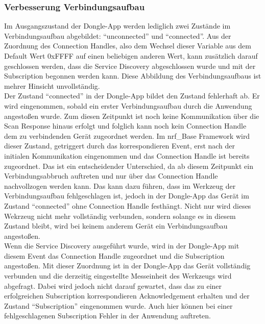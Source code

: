 \subsubsection{Verbesserung Verbindungsaufbau}
Im Ausgangszustand der Dongle-App werden lediglich zwei Zustände im Verbindungsaufbau abgebildet: ``unconnected'' und ``connected''. Aus der Zuordnung des Connection Handles, also dem Wechsel dieser Variable aus dem Default Wert 0xFFFF auf einen beliebigen anderen Wert, kann zusätzlich darauf geschlossen werden, dass die Service Discovery abgeschlossen wurde und mit der Subscription begonnen werden kann. Diese Abbildung des Verbindungsaufbaus ist mehrer Hinsicht unvollständig.\\
Der Zustand ``connected'' in der Dongle-App bildet den Zustand fehlerhaft ab. Er wird eingenommen, sobald ein erster Verbindungsaufbau durch die Anwendung angestoßen wurde. Zum diesen Zeitpunkt ist noch keine Kommunikation über die Scan Response hinaus erfolgt und folglich kann noch kein Connection Handle dem zu verbindenden Gerät zugeordnet werden. Im nrf\_Base Framework wird dieser Zustand, getriggert durch das korrespondieren Event, erst nach der initialen Kommunikation eingenommen und das Connection Handle ist bereits zugeordnet. Das ist ein entscheidender Unterschied, da ab diesem Zeitpunkt ein Verbindungsabbruch auftreten und nur über das Connection Handle nachvollzogen werden kann. Das kann dazu führen, dass im Werkzeug der Verbindungsaufbau fehlgeschlagen ist, jedoch in der Dongle-App das Gerät im Zustand ``connected'' ohne Connection Handle festhängt. Nicht nur wird dieses Wekrzeug nicht mehr vollständig verbunden, sondern solange es in diesem Zustand bleibt, wird bei keinem anderem Gerät ein Verbindungsaufbau angestoßen.\\
Wenn die Service Discovery ausgeführt wurde, wird in der Dongle-App mit diesem Event das Connection Handle zugeordnet und die Subscription angestoßen. Mit dieser Zuordnung ist in der Dongle-App das Gerät vollständig verbunden und die derzeitig eingestellte Messeinheit des Werkzeugs wird abgefragt. Dabei wird jedoch nicht darauf gewartet, dass das zu einer erfolgreichen Subscription korrespondieren Acknowledgement erhalten und der Zustand ``Subscription'' eingenommen wurde. Auch hier können bei einer fehlgeschlagenen Subscription Fehler in der Anwendung auftreten.\\
